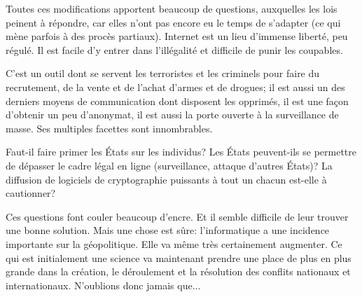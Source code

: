 \documentclass[article, french]{yReport}
\begin{document}
	Toutes ces modifications apportent beaucoup de questions, auxquelles les lois peinent à répondre, car elles n'ont pas encore eu le temps de s'adapter (ce qui mène parfois à des procès partiaux). Internet est un lieu d'immense liberté, peu régulé. Il est facile d'y entrer dans l'illégalité et difficile de punir les coupables.
	
	C'est un outil dont se servent les terroristes et les criminels pour faire du recrutement, de la vente et de l'achat d'armes et de drogues; il est aussi un des derniers moyens de communication dont disposent les opprimés, il est une façon d'obtenir un peu d'anonymat, il est aussi la porte ouverte à la surveillance de masse. Ses multiples facettes sont innombrables.
	
	Faut-il faire primer les États sur les individus? Les États peuvent-ils se permettre de dépasser le cadre légal en ligne (surveillance, attaque d'autres États)? La diffusion de logiciels de cryptographie puissants à tout un chacun est-elle à cautionner?
	
	Ces questions font couler beaucoup d'encre. Et il semble difficile de leur trouver une bonne solution. Mais une chose est sûre: l'informatique a une incidence importante sur la géopolitique. Elle va même très certainement augmenter. Ce qui est initialement une science va maintenant prendre une place de plus en plus grande dans la création, le déroulement et la résolution des conflits nationaux et internationaux. N'oublions donc jamais que...
	
	
	
	
	
\end{document}
